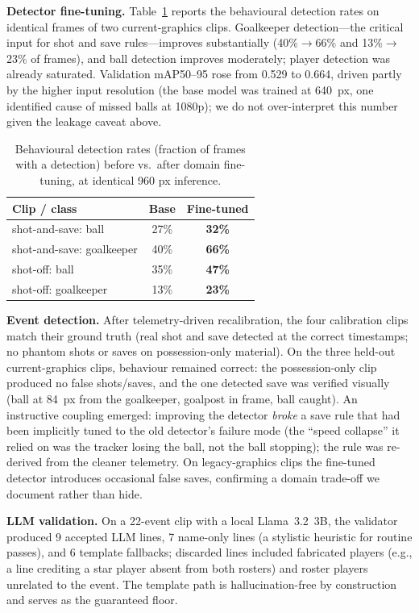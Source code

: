\documentclass[10pt,twocolumn,a4paper]{article}
\begin{document}
	\textbf{Detector fine-tuning.} Table~\ref{tab:results} reports the behavioural detection rates on identical frames of two current-graphics clips. Goalkeeper detection---the critical input for shot and save rules---improves substantially (40\%$\rightarrow$66\% and 13\%$\rightarrow$23\% of frames), and ball detection improves moderately; player detection was already saturated. Validation mAP50--95 rose from 0.529 to 0.664, driven partly by the higher input resolution (the base model was trained at 640~px, one identified cause of missed balls at 1080p); we do not over-interpret this number given the leakage caveat above.

	\begin{table}[h]
		\centering
		\caption{Behavioural detection rates (fraction of frames with a detection) before vs.\ after domain fine-tuning, at identical 960 px inference.}
		\label{tab:results}
		\begin{tabular}{|l|c|c|}
			\hline
			\textbf{Clip / class} & \textbf{Base} & \textbf{Fine-tuned} \\
			\hline
			shot-and-save: ball & 27\% & \textbf{32\%} \\
			shot-and-save: goalkeeper & 40\% & \textbf{66\%} \\
			shot-off: ball & 35\% & \textbf{47\%} \\
			shot-off: goalkeeper & 13\% & \textbf{23\%} \\
			\hline
		\end{tabular}
	\end{table}

	\textbf{Event detection.} After telemetry-driven recalibration, the four calibration clips match their ground truth (real shot and save detected at the correct timestamps; no phantom shots or saves on possession-only material). On the three held-out current-graphics clips, behaviour remained correct: the possession-only clip produced no false shots/saves, and the one detected save was verified visually (ball at 84~px from the goalkeeper, goalpost in frame, ball caught). An instructive coupling emerged: improving the detector \emph{broke} a save rule that had been implicitly tuned to the old detector's failure mode (the ``speed collapse'' it relied on was the tracker losing the ball, not the ball stopping); the rule was re-derived from the cleaner telemetry. On legacy-graphics clips the fine-tuned detector introduces occasional false saves, confirming a domain trade-off we document rather than hide.

	\textbf{LLM validation.} On a 22-event clip with a local Llama~3.2~3B, the validator produced 9 accepted LLM lines, 7 name-only lines (a stylistic heuristic for routine passes), and 6 template fallbacks; discarded lines included fabricated players (e.g., a line crediting a star player absent from both rosters) and roster players unrelated to the event. The template path is hallucination-free by construction and serves as the guaranteed floor.
\end{document}
